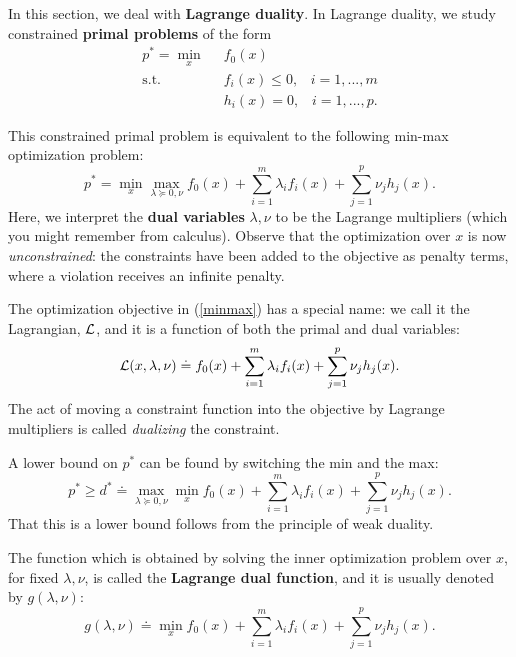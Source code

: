 \documentclass[12pt]{article}
\begin{document}
In this section, we deal with \textbf{Lagrange duality}. In Lagrange duality, we study constrained \textbf{primal problems} of the form
%
\begin{equation}
\begin{aligned}
p^* = \min_{x} \;\;& f_0(x) \\
\text{s.t. } \;\;&  f_i (x) \leq 0, \;\;\; i = 1, ..., m \\
& h_i (x) = 0, \;\;\; i= 1, ..., p.
\end{aligned} \label{primal}
\end{equation}

This constrained primal problem is equivalent to the following min-max optimization problem:
%
\begin{equation}
p^* = \min_x \max_{\lambda \succeq 0, \nu} f_0 (x) + \sum_{i=1}^m \lambda_i f_i (x) + \sum_{j=1}^p \nu_j h_j (x). \label{minmax}
\end{equation}
%
Here, we interpret the \textbf{dual variables} $\lambda, \nu$ to be the Lagrange multipliers (which you might remember from calculus). Observe that the optimization over $x$ is now \textit{unconstrained}: the constraints have been added to the objective as penalty terms, where a violation receives an infinite penalty. 

The optimization objective in (\ref{minmax}) has a special name: we call it the Lagrangian, ${\mathcal L}$, and it is a function of both the primal and dual variables:
%
\begin{equation*}
{\mathcal L}(x, \lambda, \nu) \doteq f_0 (x) + \sum_{i=1}^m \lambda_i f_i (x) + \sum_{j=1}^p \nu_j h_j (x).
\end{equation*}
%
The act of moving a constraint function into the objective by Lagrange multipliers is called \textit{dualizing} the constraint. 

A lower bound on $p^*$ can be found by switching the min and the max:
%
\begin{equation}
p^* \geq d^* \doteq \max_{\lambda \succeq 0, \nu} \min_x  f_0 (x) + \sum_{i=1}^m \lambda_i f_i (x) + \sum_{j=1}^p \nu_j h_j (x). \label{maxmin}
\end{equation}
%
That this is a lower bound follows from the principle of weak duality.

The function which is obtained by solving the inner optimization problem over $x$, for fixed $\lambda, \nu$, is called the \textbf{Lagrange dual function}, and it is usually denoted by $g(\lambda, \nu)$:
%
\begin{equation*}
g(\lambda, \nu) \doteq \min_x f_0 (x)+ \sum_{i=1}^m \lambda_i f_i (x) + \sum_{j=1}^p \nu_j h_j (x).
\end{equation*}
\end{document}
